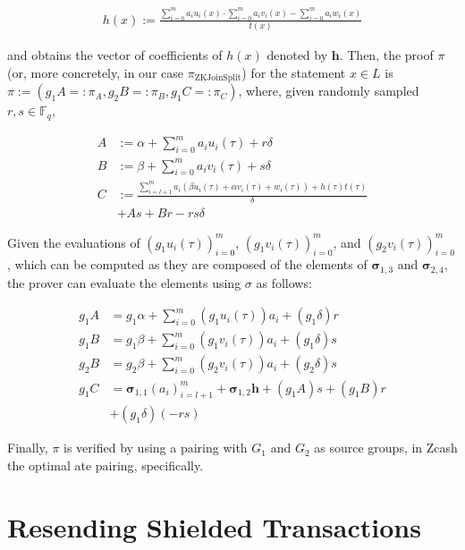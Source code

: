 \documentclass{article}
\begin{document}
\begin{align}h(x) := \frac{\sum_{i=0}^m a_iu_i(x) \cdot \sum_{i=0}^m a_iv_i(x) - \sum_{i=0}^{m} a_iw_i(x)}{t(x)} \label{eq:h}\end{align}

and obtains the vector of coefficients of $h(x)$ denoted by $\boldsymbol{h}$.
Then, the proof $\pi$ (or, more concretely, in our case $\pi_\text{ZKJoinSplit}$) for the statement $x \in L$ is $\pi := (g_1A =: \pi_A, g_2B =: \pi_B, g_1C =: \pi_C)$, where, given randomly sampled $r,s\in \mathbb{F}_q$,

\begin{align}
        A &:= \alpha + \sum_{i=0}^m a_iu_i(\tau) + r\delta \label{eq:A} \\
        B &:= \beta + \sum_{i=0}^m a_iv_i(\tau) + s\delta \label{eq:B} \\
        C &:= \frac{\sum_{i=l+1}^m a_i(\beta u_i(\tau) + \alpha v_i(\tau) + w_i(\tau)) + h(\tau)t(\tau)}{\delta} \label{eq:C} \\
        & + As + Br - rs\delta \nonumber
\end{align}

Given the evaluations of $(g_1{u_i(\tau)})_{i=0}^m$, $(g_1{v_i(\tau)})_{i=0}^m$, and $(g_2{v_i(\tau)})_{i=0}^m$, which can be computed as they are composed of the elements of $\boldsymbol\sigma_{1,3}$ and $\boldsymbol\sigma_{2,4}$, the prover can evaluate the elements using $\sigma$ as follows:

\begin{align}
        g_1A &= g_1\alpha + \sum_{i=0}^m {(g_1{u_i(\tau)})}{a_i} + {(g_1{\delta})}r \label{eq:gA} \\
        g_1B &= g_1\beta + \sum_{i=0}^m {(g_1{v_i(\tau)})}{a_i} + {(g_1{\delta})}s \label{eq:g1B} \\
        g_2B &= g_2\beta + \sum_{i=0}^m {(g_2{v_i(\tau)})}{a_i} + {(g_2{\delta})}s \label{eq:g2B} \\
        g_1C &= \boldsymbol\sigma_{1,1}(a_i)_{i=l+1}^m + \boldsymbol\sigma_{1,2}\boldsymbol{h} + {(g_1A)}s + {(g_1B)}r \nonumber \\
        &+ {(g_1\delta)}{(-rs)} \label{eq:gC} 
\end{align}

Finally, $\pi$ is verified by using a pairing with $G_1$ and $G_2$ as source groups, in Zcash the optimal ate pairing\cite{vercauteren:optimal-ate}, specifically.

\section{Resending Shielded Transactions} \label{sec:resending}
\end{document}
